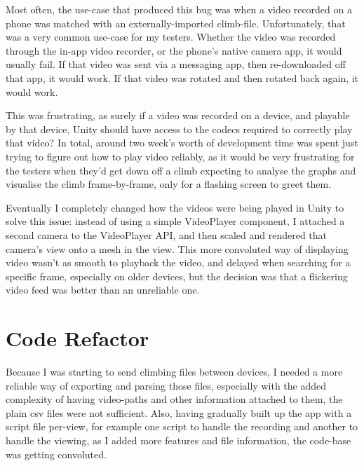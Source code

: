 Most often, the use-case that produced this bug was when a video recorded on a phone was matched with an externally-imported climb-file.
Unfortunately, that was a very common use-case for my testers.
Whether the video was recorded through the in-app video recorder, or the phone's native camera app, it would usually fail.
If that video was sent via a messaging app, then re-downloaded off that app, it would work.
If that video was rotated and then rotated back again, it would work.

This was frustrating, as surely if a video was recorded on a device, and playable by that device, Unity should have access to the codecs required to correctly play that video?
In total, around two week's worth of development time was spent just trying to figure out how to play video reliably, as it would be very frustrating for the testers when they'd get down off a climb expecting to analyse the graphs and visualise the climb frame-by-frame, only for a flashing screen to greet them.

Eventually I completely changed how the videos were being played in Unity to solve this issue: instead of using a simple VideoPlayer component, I attached a second camera to the VideoPlayer API, and then scaled and rendered that camera's view onto a mesh in the view.
This more convoluted way of displaying video wasn't as smooth to playback the video, and delayed when searching for a specific frame, especially on older devices, but the decision was that a flickering video feed was better than an unreliable one.







\section{Code Refactor}
Because I was starting to send climbing files between devices, I needed a more reliable way of exporting and parsing those files, especially with the added complexity of having video-paths and other information attached to them, the plain csv files were not sufficient.
Also, having gradually built up the app with a script file per-view, for example one script to handle the recording and another to handle the viewing, as I added more features and file information, the code-base was getting convoluted.

